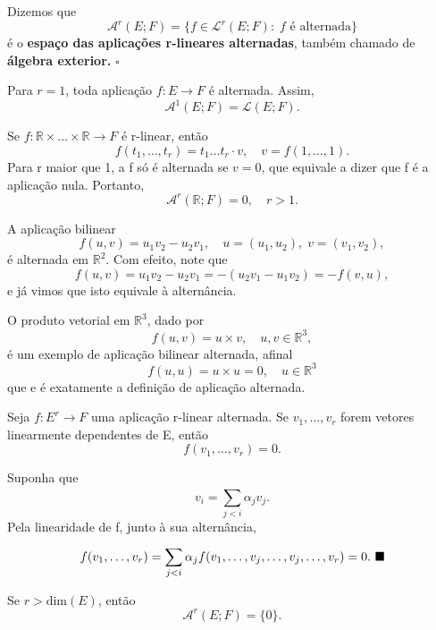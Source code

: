 \documentclass[../differential_forms.tex]{subfiles}
\begin{document}
\begin{def*}
  Dizemos que 
    \[
    \mathcal{A}^{r}(E; F)=\{f\in \mathcal{L}^{r}(E; F):\; f \text{ é alternada}\}
    \]
    é o \textbf{espaço das aplicações r-lineares alternadas}, também chamado de \textbf{álgebra exterior.} \(\square\)
\end{def*}
\begin{example}
  Para \(r=1\), toda aplicação \(f:E\rightarrow F\) é alternada. Assim, 
    \[
      \mathcal{A}^{1}(E; F)=\mathcal{L}(E; F).
    \]
\end{example}
\begin{example}
  Se \(f:\mathbb{R}\times \dotsc \times \mathbb{R}\rightarrow F\) é r-linear, então 
    \[
      f(t_1,\dotsc , t_r)=t_1 \dotsc t_r \cdot v,\quad v=f(1,\dotsc ,1).
    \]
    Para r maior que 1, a f só é alternada se \(v=0\), que equivale a dizer que f é a aplicação nula. Portanto, 
      \[
      \mathcal{A}^{r}(\mathbb{R}; F)=0,\quad r>1.
      \]
  \end{example}
 \begin{example}
   A aplicação bilinear 
     \[
       f(u, v)=u_1v_2-u_2v_1,\quad u=(u_1,u_2),\; v=(v_1, v_2),
     \]
     é alternada em \(\mathbb{R}^{2}.\) Com efeito, note que 
       \[
         f(u, v)=u_1v_2-u_2v_1 = -(u_2v_1 - u_1v_2) = - f(v, u),
       \]
       e já vimos que isto equivale à alternância.
 \end{example}
 \begin{example}
   O produto vetorial em \(\mathbb{R}^{3}\), dado por 
     \[
       f(u, v)=u \times v,\quad u, v\in \mathbb{R}^{3}, 
     \]
     é um exemplo de aplicação bilinear alternada, afinal 
       \[
         f(u, u) = u \times u = 0, \quad u\in \mathbb{R}^{3}
       \]
       que e é exatamente a definição de aplicação alternada.
 \end{example}
 \begin{prop*}
   Seja \(f:E^{r}\rightarrow F\) uma aplicação r-linear alternada. Se \(v_1,\dotsc ,v_r\) forem vetores linearmente dependentes de E, então 
     \[
       f(v_1,\dotsc , v_r)=0.
     \]
 \end{prop*}
 \begin{proof*}
   Suponha que  
     \[
       v_{i} = \sum\limits_{j<i}^{}\alpha_{j}v_{j}.
     \]
     Pela linearidade de f, junto à sua alternância, 
       \[
         f(v_1,\dotsc ,v_r)=\sum\limits_{j<i}^{}\alpha_{j}f(v_1,\dotsc , v_{j},\dotsc , v_{j}, \dotsc , v_r)=0. \text{ $\blacksquare$}
       \]
 \end{proof*}
 \begin{crl*}
   Se \(r>\mathrm{dim}(E)\), então 
     \[
     \mathcal{A}^{r}(E; F)=\{0\}.
     \]
 \end{crl*}
\end{document}
